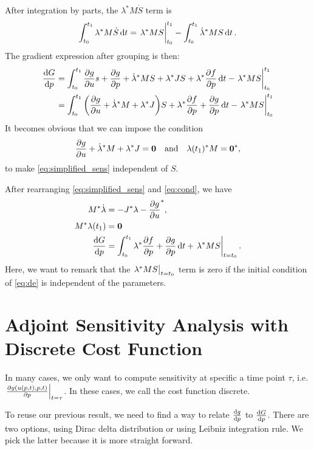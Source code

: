 \documentclass[a4paper,9pt]{article}
\theoremstyle{definition}
\theoremstyle{remark}
\begin{document}
After integration by parts, the $\lambda^* M\dot{S}$ term is
\begin{align}
  \int_{t_0}^{t_1} \lambda^* M\dot{S} \dd{t} = \eval{\lambda^* MS}_{t_0}^{t_1} -
  \int_{t_0}^{t_1} \dot{\lambda}^* MS \dd{t}.
\end{align}
The gradient expression after grouping is then:
\begin{align} \label{eq:simplified_sens}
  \dv{G}{p} &= \int_{t_0}^{t_1} \pdv{g}{u}s + \pdv{g}{p}
  + \dot{\lambda}^* MS + \lambda^* JS+ \lambda^* \pdv{f}{p} \dd{t}
              - \eval{\lambda^* MS}_{t_0}^{t_1} \nonumber \\
            &= \int_{t_0}^{t_1} \qty(\pdv{g}{u} + \dot{\lambda}^*M  + \lambda^*
            J)S +\lambda^* \pdv{f}{p}  + \pdv{g}{p} \dd{t}
              - \eval{\lambda^* MS}_{t_0}^{t_1}
\end{align}
It becomes obvious that we can impose the condition
\begin{equation} \label{eq:cond}
  \pdv{g}{u} + \dot{\lambda}^*M + \lambda^* J = \bm{0} \qq{and}
  \lambda(t_1)^* M = \bm{0}^*,
\end{equation}
to make \cref{eq:simplified_sens} independent of $S$.

After rearranging \cref{eq:simplified_sens} and \cref{eq:cond}, we have
\begin{align}
    M^*\dot{\lambda} &= -J^* \lambda - \pdv{g}{u}^*, \label{eq:adj_eq_cont}\\
    M^* \lambda(t_1) &= \bm{0} \label{eq:init_cont}\\
    \dv{G}{p} &= \int_{t_0}^{t_1} \lambda^* \pdv{f}{p}  + \pdv{g}{p} \dd{t}
    + \eval{\lambda^* MS}_{t=t_0}. \label{eq:sens_int}
\end{align}
Here, we want to remark that the $\eval{\lambda^* MS}_{t=t_0}$ term is zero if
the initial condition of \cref{eq:de} is independent of the parameters.

\section{Adjoint Sensitivity Analysis with Discrete Cost Function}
In many cases, we only want to compute sensitivity at specific a time point
$\tau$, i.e. $\eval{\pdv{g(u(p, t), p, t)}{p}}_{t=\tau}$. In these cases, we
call the cost function discrete.

To reuse our previous result, we need to find a way to relate $\dv{g}{p}$ to
$\dv{G}{p}$. There are two options, using Dirac delta distribution or using
Leibniz integration rule. We pick the latter because it is more straight
forward.
\end{document}

